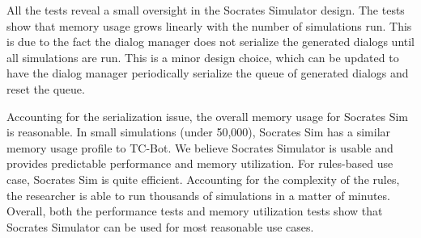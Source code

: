 All the tests reveal a small oversight in the Socrates Simulator design. The tests show that memory usage grows linearly with the number of simulations run. This is due to the fact the dialog manager does not serialize the generated dialogs until all simulations are run. This is a minor design choice, which can be updated to have the dialog manager periodically serialize the queue of generated dialogs and reset the queue. 

Accounting for the serialization issue, the overall memory usage for Socrates Sim is reasonable. In small simulations (under 50,000), Socrates Sim has a similar memory usage profile to TC-Bot. We believe Socrates Simulator is usable and provides predictable performance and memory utilization. For rules-based use case, Socrates Sim is quite efficient. Accounting for the complexity of the rules, the researcher is able to run thousands of simulations in a matter of minutes. Overall, both the performance tests and memory utilization tests show that Socrates Simulator can be used for most reasonable use cases. 
